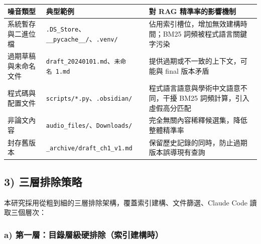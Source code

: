 {\def\LTcaptype{none} %
\begin{longtable}[]{@{}
  >{\raggedright\arraybackslash}p{}
  >{\raggedright\arraybackslash}p{}
  >{\raggedright\arraybackslash}p{}@{}}
\toprule\noalign{}
\begin{minipage}[b]{\linewidth}\raggedright
噪音類型
\end{minipage} & \begin{minipage}[b]{\linewidth}\raggedright
典型範例
\end{minipage} & \begin{minipage}[b]{\linewidth}\raggedright
對 RAG 精準率的影響機制
\end{minipage} \\
\midrule\noalign{}
\endhead
\bottomrule\noalign{}
\endlastfoot
系統暫存與二進位檔 &
\texttt{.DS\_Store}、\texttt{\_\_pycache\_\_/}、\texttt{.venv/} &
佔用索引槽位，增加無效建構時間；BM25 詞頻被程式語言關鍵字污染 \\
過期草稿與未命名文件 &
\texttt{draft\_20240101.md}、\texttt{未命名\ 1.md} &
提供過期或不一致的上下文，可能與 final 版本矛盾 \\
程式碼與配置文件 & \texttt{scripts/*.py}、\texttt{.obsidian/} &
程式語言語意與學術中文語意不同，干擾 BM25 詞頻計算，引入虛假高分匹配 \\
非論文內容 & \texttt{audio\_files/}、\texttt{Downloads/} &
完全無關內容稀釋候選集，降低整體精準率 \\
封存舊版本 & \texttt{\_archive/draft\_ch1\_v1.md} &
保留歷史記錄的同時，防止過期版本誤導現有查詢 \\
\end{longtable}
}

\subsection{3) 三層排除策略}\label{ux4e09ux5c64ux6392ux9664ux7b56ux7565}

本研究採用從粗到細的三層排除架構，覆蓋索引建構、文件篩選、Claude Code
讀取三個層次：

\subsubsection{a)
第一層：目錄層級硬排除（索引建構時）}\label{a-ux7b2cux4e00ux5c64ux76eeux9304ux5c64ux7d1aux786cux6392ux9664ux7d22ux5f15ux5efaux69cbux6642}


